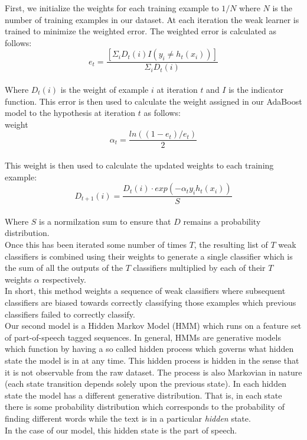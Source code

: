 \documentclass[11pt,letterpaper]{article}
\begin{document}
First, we initialize the weights for each training example to $1/N$ where $N$
is the number of training examples in our dataset.  At each iteration the weak
learner is trained to minimize the weighted error.  The weighted error is
calculated as follows:\\ 
$$e_t = \frac{[\Sigma_i D_t(i)I(y_i\neq h_t(x_i))]}{\Sigma_iD_t(i)}$$\\
Where $D_t(i)$ is the weight of example $i$ at iteration $t$ and $I$ is the indicator function.  This error is then used to calculate the weight assigned in our AdaBoost model to the hypothesis at iteration $t$ as follows:\\
weight $$\alpha_t = \frac{ln((1-e_t)/e_t)}{2}$$\\
This weight is then used to calculate the updated weights to each training example:\\
$$D_{t+1}(i) = \frac{D_t(i)\cdot exp(-\alpha_ty_ih_t(x_i))}{S}$$\\
Where $S$ is a normilzation sum to ensure that $D$ remains a probability distribution.\\
Once this has been iterated some number of times $T$, the resulting list of $T$ weak classifiers is combined using their weights to generate a single classifier which is the sum of all the outputs of the $T$ classifiers multiplied by each of their $T$ weights $\alpha$ respectively.\\

In short, this method weights a sequence of weak classifiers where subsequent classifiers are biased towards correctly classifying those examples which previous classifiers failed to correctly classify.\\

Our second model is a Hidden Markov Model (HMM) which runs on a feature set of part-of-speech tagged sequences.  In general, HMMs are generative models which function by having a so called hidden process which governs what hidden state the model is in at any time.  This hidden process is hidden  in the sense that it is not observable from the raw dataset.  The process is also Markovian in nature (each state transition depends solely upon the previous state).  In each hidden state the model has a different generative distribution.  That is, in each state there is some probability distribution which corresponds to the probability of finding different words while the text is in a particular {\it hidden} state.\\

In the case of our model, this hidden state is the part of speech.\\
\end{document}

